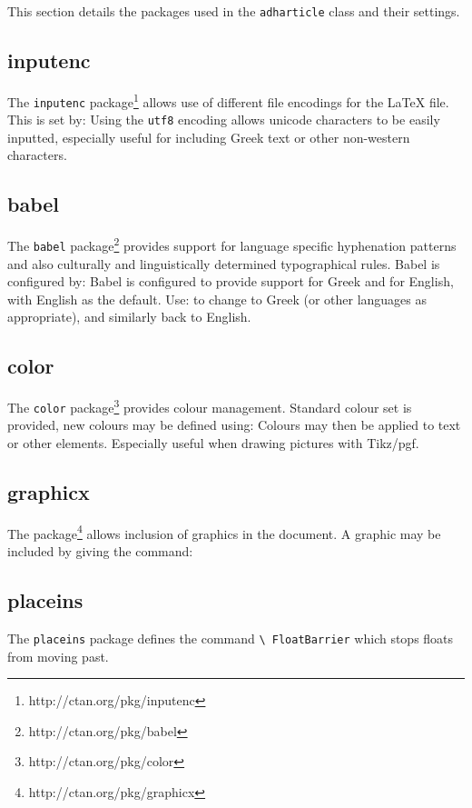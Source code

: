 \documentclass{adharticle}  %
\begin{document}
This section details the packages used in the \texttt{adharticle} class and
their settings.

\subsection{inputenc}

The \texttt{inputenc} package\footnote{http://ctan.org/pkg/inputenc} allows use
of different file encodings for the LaTeX file. This is set by:
Using the \texttt{utf8} encoding allows unicode characters to be easily
inputted, especially useful for including Greek text or other non-western
characters.

\subsection{babel}

The \texttt{babel} package\footnote{http://ctan.org/pkg/babel} provides support
for language specific hyphenation patterns and also culturally and
linguistically determined typographical rules. Babel is configured by:
Babel is configured to provide support for Greek and for English, with English
as the default. Use:
to change to Greek (or other  languages as appropriate), and similarly back to
English.

\subsection{color}

The \texttt{color} package\footnote{http://ctan.org/pkg/color} provides colour
management. Standard colour set is provided, new colours may be defined using:
Colours may then be applied to text or other elements. Especially useful when
drawing pictures with Tikz/pgf.

\subsection{graphicx}

The  package\footnote{http://ctan.org/pkg/graphicx} allows
inclusion of graphics in the document. A graphic may be included by giving the
command:

\subsection{placeins}

The \texttt{placeins} package defines the command \texttt{\textbackslash
  FloatBarrier} which stops floats from moving past.
\end{document}
